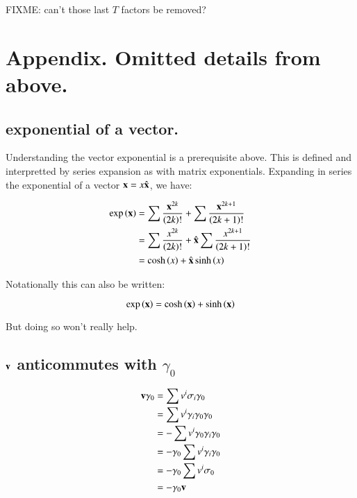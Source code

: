 \documentclass{article}      %
\begin{document}
FIXME: can't those last $T$ factors be removed?

\section{ Appendix. Omitted details from above. }

\subsection{ exponential of a vector. } 

Understanding the vector exponential is a prerequisite above.  This is defined
and interpretted by series expansion as with matrix exponentials.
Expanding
in series the exponential of a vector $\mathbf{x} = x\hat{\mathbf{x}}$, we have:

\begin{align*}
\exp\left(\mathbf{x}\right)
&= \sum \frac{\mathbf{x}^{2k}}{\left(2k\right)!} + \sum \frac{\mathbf{x}^{2k+1}}{\left(2k+1\right)!} \\
&= \sum \frac{x^{2k}}{\left(2k\right)!} + \hat{\mathbf{x}} \sum \frac{x^{2k+1}}{\left(2k+1\right)!} \\
&= \cosh\left(x\right) + \hat{\mathbf{x}} \sinh\left(x\right)
\end{align*}

Notationally this can also be written:

\begin{equation*}
\exp\left(\mathbf{x}\right) = \cosh\left(\mathbf{x}\right) + \sinh\left(\mathbf{x}\right)
\end{equation*}

But doing so won't really help.

\subsection{ $\mathbf{v}$ anticommutes with $\gamma_0$ }

\begin{align*}
\mathbf{v} \gamma_0 
&= \sum v^i \sigma_i \gamma_0 \\
&= \sum v^i \gamma_i \gamma_0 \gamma_0 \\
&= -\sum v^i \gamma_0 \gamma_i \gamma_0 \\
&= - \gamma_0 \sum v^i \gamma_i \gamma_0 \\
&= - \gamma_0 \sum v^i \sigma_0 \\
&= - \gamma_0 \mathbf{v}
\end{align*}
\end{document}
